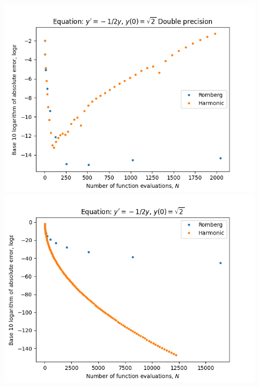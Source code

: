 \begin{figure}[H]
\centering
\begin{minipage}{0.45\textwidth}
\centering
\includegraphics[scale=0.45]{../results/emr_plots/quad_sing_0.png}
\end{minipage}
\begin{minipage}{0.45\textwidth}
\centering
\includegraphics[scale=0.45]{../results/emr_plots/quad_sing_0_hp.png}
\end{minipage}
\end{figure}


